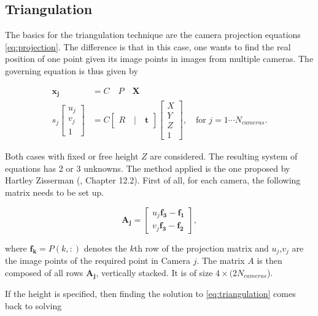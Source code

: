 \subsection{Triangulation}
\label{sec:triangulation}

The basics for the triangulation technique are the camera projection equations \eqref{eq:projection}.
The difference is that in this case, one wants to find the real position of one point given its image points in images from multiple cameras. The governing equation is thus given by

\begin{align}
    \mathbf{x_j} & = C \quad P \quad \mathbf{X} \\
    s_j \begin{bmatrix} u_j \\ v_j \\ 1 \end{bmatrix} &= 
    C \begin{bmatrix} R \quad|\quad \mathbf{t} \end{bmatrix}
    \begin{bmatrix} X \\ Y \\  Z \\ 1 \end{bmatrix}, \quad \text{for }j=1\cdots N_{cameras}.
    \label{eq:triangulation}
 \end{align}

Both cases with fixed or free height $Z$ are considered. The resulting system of equations has 2 or 3 unknowns. 
The method applied is the one proposed by Hartley Zisserman (\cite{hz}, Chapter 12.2). 
First of all, for each camera, the following matrix needs to be set up. 

\begin{equation}
    \mathbf{A_j} = \begin{bmatrix} u_j \mathbf{f_3}-\mathbf{f_1} \\ v_j \mathbf{f_3}-\mathbf{f_2} \end{bmatrix},
\end{equation}

where $\mathbf{f_k}=P(k,:)$ denotes the $k$th row of the projection matrix and $u_j$,$v_j$ are the image points of the required point in Camera $j$.
The matrix $A$ is then composed of all rows $\mathbf{A_j}$, vertically stacked. It is of size $4\times(2 N_{cameras}$).

If the height is specified, then finding the solution to \eqref{eq:triangulation} comes back to solving

